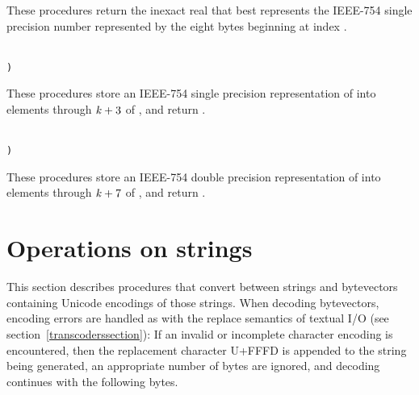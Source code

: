 \begin{entry}{%
}


These procedures return the inexact real that best represents the IEEE-754 single
precision number represented by the eight bytes beginning at index
.
\end{entry}

\begin{entry}{%
}
{\tt\obeyspaces\\
       )}


These procedures store an IEEE-754 single precision representation of  into
elements  through $\textnormal{\textit{k}}+3$ of , and return
\unspecifiedreturn.
\end{entry}

\begin{entry}{%
}
{\tt\obeyspaces\\
       )}


These procedures store an IEEE-754 double precision representation of  into
elements  through $\textnormal{\textit{k}}+7$ of , and return
\unspecifiedreturn.
\end{entry}

\section{Operations on strings}

This section describes procedures that convert between strings and
bytevectors containing Unicode encodings of those strings.  When
decoding bytevectors, encoding errors are handled as with the {\cf
  replace} semantics of textual I/O (see
section~\ref{transcoderssection}): If an invalid or incomplete
character encoding is encountered, then the replacement character
U+FFFD is appended to the string being generated, an appropriate
number of bytes are ignored, and decoding continues with the following
bytes.

